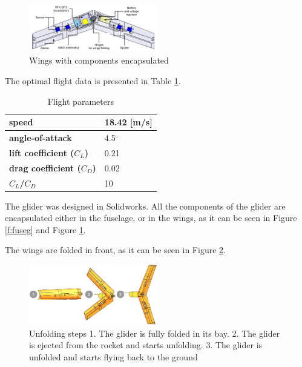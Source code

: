 \begin{figure}[h!]
    \centering
        \includegraphics[width=0.5\textwidth]{img/wings.jpg}
        \caption{Wings with components encapsulated}
        \label{f:wings}
 \end{figure}


The optimal flight data is presented in Table \ref{flight_param}.

\begin{table}[h!]
\centering
\begin{tabular}{|l|l|}
\hline
\textbf{speed}                    & 18.42 {[}m/s{]} \\ \hline
\textbf{angle-of-attack}          & 4.5$^\circ$                        \\ \hline
\textbf{lift coefficient ($C_L$)} & 0.21                               \\ \hline
\textbf{drag coefficient ($C_D$)} & 0.02                               \\ \hline
\textbf{$C_L$/$C_D$}              & 10                                 \\ \hline
\end{tabular}
\caption{Flight parameters}
\label{flight_param}
\end{table}


The glider was designed in Solidworks. All the components of the glider are encapsulated either in the fuselage, or in the wings, as it can be seen in Figure \ref{f:fuseg} and Figure  \ref{f:wings}.




The wings are folded in front, as it can be seen in Figure \ref{f:folding}.

\begin{figure}[h!]
    \centering
        \includegraphics[width=0.5\textwidth]{img/folding.png}
        \caption{Unfolding steps 1. The glider is fully folded in its bay. 2. The glider is ejected from the rocket and starts unfolding. 3. The glider is unfolded and starts flying back to the ground}
        \label{f:folding}
 \end{figure}

